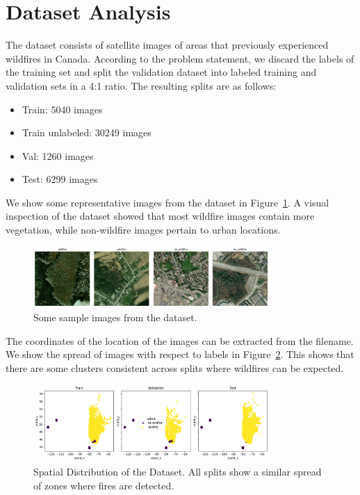 \documentclass{article}
\begin{document}
\section{Dataset Analysis}

The dataset consists of satellite images of areas that previously experienced
wildfires in Canada. According to the problem statement, we discard the labels
of the training set and split the validation dataset into labeled training and
validation sets in a 4:1 ratio. The resulting splits are as follows:

\begin{itemize}
  \item Train: 5040 images
  \item Train unlabeled: 30249 images
  \item Val: 1260 images
  \item Test: 6299 images
\end{itemize}

We show some representative images from the dataset in
Figure~\ref{fig:samples}. A visual inspection of the dataset showed that most
wildfire images contain more vegetation, while non-wildfire images pertain to
urban locations.

\begin{figure}
  \centering
  \includegraphics[width=0.8\textwidth]{figures/samples2.png}
  \caption{Some sample images from the dataset.}
  \label{fig:samples}
\end{figure}

The coordinates of the location of the images can be extracted from the
filename. We show the spread of images with respect to labels in
Figure~\ref{fig:coordinate_analysis}. This shows that there are some clusters
consistent across splits where wildfires can be expected.

\begin{figure}
  \centering
  \includegraphics[width=0.8\textwidth]{figures/coord_label.png}
  \caption{Spatial Distribution of the Dataset. All splits show a similar spread of zones where fires are detected.}
  \label{fig:coordinate_analysis}
\end{figure}
\end{document}
